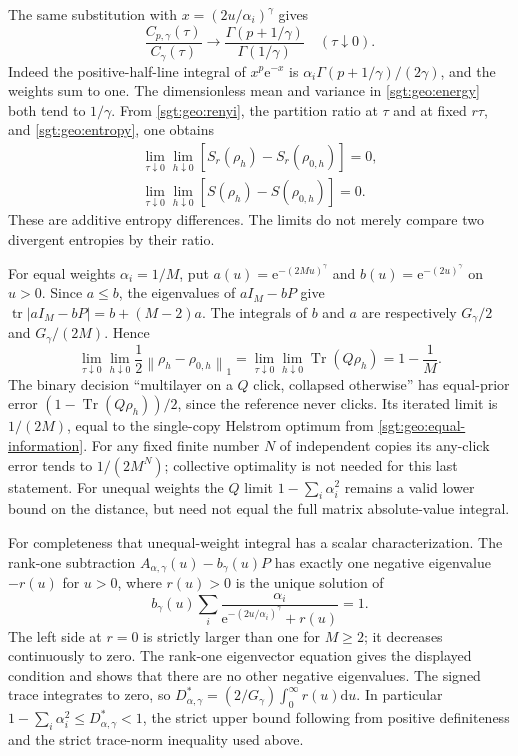 \documentclass[aps,pra,reprint,superscriptaddress,longbibliography]{revtex4-2}
\newcommand{\Tr}{\operatorname{Tr}}
\newcommand{\dd}{\mathrm d}
\newcommand{\ee}{\mathrm e}
\newcommand{\norm}[1]{\left\lVert#1\right\rVert}
\begin{document}
The same substitution with $x=(2u/\alpha_i)^\gamma$ gives
\begin{equation}
 \frac{C_{p,\gamma}(\tau)}{C_\gamma(\tau)}
 \longrightarrow\frac{\Gamma(p+1/\gamma)}{\Gamma(1/\gamma)}
 \quad(\tau\downarrow0).
 \label{sgt:geo:moment-endpoint}
\end{equation}
Indeed the positive-half-line integral of $x^p\ee^{-x}$ is
$\alpha_i\Gamma(p+1/\gamma)/(2\gamma)$, and the weights sum to one.
The dimensionless mean and variance in \eqref{sgt:geo:energy} both
tend to $1/\gamma$.  From \eqref{sgt:geo:renyi}, the partition ratio
at $\tau$ and at fixed $r\tau$, and \eqref{sgt:geo:entropy}, one obtains
\begin{equation}
\begin{gathered}
 \lim_{\tau\downarrow0}\lim_{h\downarrow0}
     [S_r(\rho_h)-S_r(\rho_{0,h})]=0,
 \\
 \lim_{\tau\downarrow0}\lim_{h\downarrow0}
     [S(\rho_h)-S(\rho_{0,h})]=0.
 \label{sgt:geo:scalar-agreement}
\end{gathered}
\end{equation}
These are additive entropy differences.  The limits do not merely
compare two divergent entropies by their ratio.

For equal weights $\alpha_i=1/M$, put
$a(u)=\ee^{-(2M u)^\gamma}$ and $b(u)=\ee^{-(2u)^\gamma}$ on $u>0$.
Since $a\leq b$, the eigenvalues of $aI_M-bP$ give
$\operatorname{tr}|aI_M-bP|=b+(M-2)a$.
The integrals of $b$ and $a$ are respectively $G_\gamma/2$ and
$G_\gamma/(2M)$.  Hence
\begin{equation}
 \lim_{\tau\downarrow0}\lim_{h\downarrow0}
       \frac12\norm{\rho_h-\rho_{0,h}}_1
 =\lim_{\tau\downarrow0}\lim_{h\downarrow0}\Tr(Q\rho_h)
 =1-\frac1M.
 \label{sgt:geo:equal-information}
\end{equation}
The binary decision ``multilayer on a $Q$ click, collapsed otherwise''
has equal-prior error $(1-\Tr(Q\rho_h))/2$, since the reference never
clicks.  Its iterated limit is $1/(2M)$, equal to the single-copy
Helstrom optimum from \eqref{sgt:geo:equal-information}.
For any fixed finite number $N$ of independent copies its any-click
error tends to $1/(2M^N)$; collective optimality is not needed for this
last statement.  For unequal weights the $Q$ limit
$1-\sum_i\alpha_i^2$ remains a valid lower bound on the distance,
but need not equal the full matrix absolute-value integral.

For completeness that unequal-weight integral has a scalar
characterization.  The rank-one subtraction
$A_{\alpha,\gamma}(u)-b_\gamma(u)P$ has exactly one negative eigenvalue
$-r(u)$ for $u>0$, where $r(u)>0$ is the unique solution of
\[
 b_\gamma(u)\sum_i
 \frac{\alpha_i}{\ee^{-(2u/\alpha_i)^\gamma}+r(u)}=1.
\]
The left side at $r=0$ is strictly larger than one for $M\geq2$;
it decreases continuously to zero.  The rank-one eigenvector equation
gives the displayed condition and shows that there are no other
negative eigenvalues.  The signed trace integrates to zero, so
$D^*_{\alpha,\gamma}=(2/G_\gamma)\int_0^\infty r(u)\dd u$.
In particular $1-\sum_i\alpha_i^2\leq D^*_{\alpha,\gamma}<1$,
the strict upper bound following from positive definiteness and the
strict trace-norm inequality used above.
\end{document}
